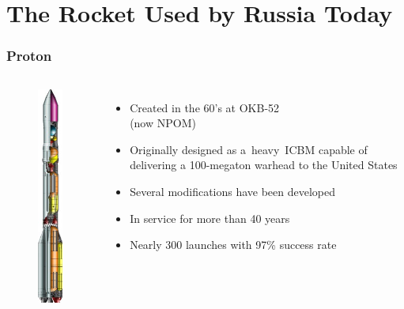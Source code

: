 \documentclass[onlymath]{beamer}
\begin{document}
\section{The Rocket Used by Russia Today}
\begin{frame}
  \frametitle{Proton}

  \begin{columns}
    \begin{figure}
      \centering
      \includegraphics[scale=0.4]{Proton-K-scheme.jpg}
    \end{figure}

    \begin{itemize}
    \item Created in the 60's at OKB-52\\ (now NPOM)
    \item Originally designed as a heavy \textsc{ICBM} capable of
      delivering a 100-megaton warhead to the United States
    \item Several modifications have been developed
    \item In service for more than 40 years
    \item Nearly 300 launches with 97\% success rate
    \end{itemize}
  \end{columns}
\end{frame}
\end{document}
